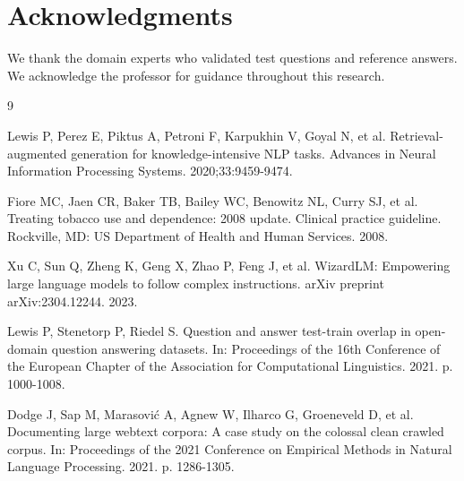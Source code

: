 \documentclass[10pt,letterpaper]{article}
\begin{document}
\section*{Acknowledgments}
We thank the domain experts who validated test questions and reference answers. We acknowledge the professor for guidance throughout this research.

\begin{thebibliography}{9}

Lewis P, Perez E, Piktus A, Petroni F, Karpukhin V, Goyal N, et al.
\newblock Retrieval-augmented generation for knowledge-intensive NLP tasks.
\newblock Advances in Neural Information Processing Systems. 2020;33:9459-9474.

Fiore MC, Jaen CR, Baker TB, Bailey WC, Benowitz NL, Curry SJ, et al.
\newblock Treating tobacco use and dependence: 2008 update.
\newblock Clinical practice guideline. Rockville, MD: US Department of Health and Human Services. 2008.

Xu C, Sun Q, Zheng K, Geng X, Zhao P, Feng J, et al.
\newblock WizardLM: Empowering large language models to follow complex instructions.
\newblock arXiv preprint arXiv:2304.12244. 2023.

Lewis P, Stenetorp P, Riedel S.
\newblock Question and answer test-train overlap in open-domain question answering datasets.
\newblock In: Proceedings of the 16th Conference of the European Chapter of the Association for Computational Linguistics. 2021. p. 1000-1008.

Dodge J, Sap M, Marasović A, Agnew W, Ilharco G, Groeneveld D, et al.
\newblock Documenting large webtext corpora: A case study on the colossal clean crawled corpus.
\newblock In: Proceedings of the 2021 Conference on Empirical Methods in Natural Language Processing. 2021. p. 1286-1305.

\end{thebibliography}
\end{document}
